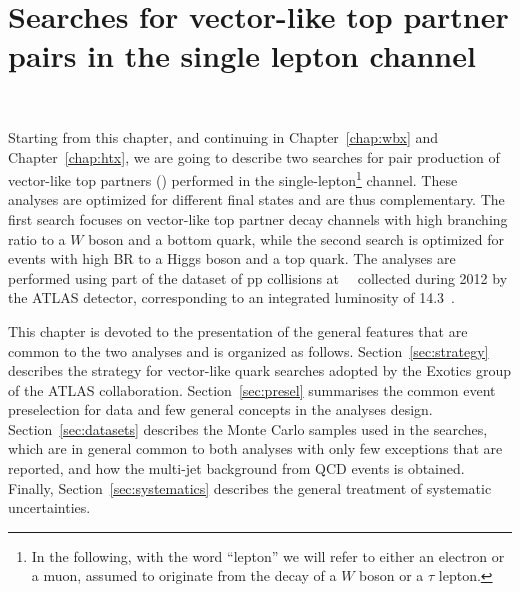 \clearpage{\pagestyle{empty}\cleardoublepage}

\chapter{Searches for vector-like top partner pairs in the single lepton channel}~\label{chap:vlq}

Starting from this chapter, and continuing in Chapter~\ref{chap:wbx} 
and Chapter~\ref{chap:htx}, we are going to describe two 
searches for pair production of vector-like top 
partners (\TTbar) performed in the 
single-lepton\footnote{In the following, with the 
word ``lepton'' we will 
refer to either an electron or a muon, assumed to 
originate from the decay of a $W$ boson or a $\tau$ lepton.}
 channel. These analyses
are optimized for different final states and are thus complementary.
The first search focuses on  vector-like top partner decay channels with high 
branching ratio to 
a $W$ boson and a bottom quark, while the second search is optimized for events with 
high BR to a Higgs boson and a top quark. 
The analyses are performed using part
of the dataset of pp collisions at
~\tev\ collected during 2012
by the ATLAS detector, corresponding to an integrated luminosity of  14.3~\ifb.

This chapter is devoted to the presentation of the general features that are common to 
the two analyses and is organized as follows.
Section~\ref{sec:strategy}
describes the strategy for vector-like quark searches adopted 
by the Exotics group of the ATLAS collaboration.
Section~\ref{sec:presel}
summarises the common event preselection for data and few general concepts in the
analyses design. Section~\ref{sec:datasets}
describes the Monte Carlo samples used in the searches, which
are in general common to both analyses with only few exceptions that are reported,
and how the multi-jet background from QCD events is
obtained. 
Finally, Section~\ref{sec:systematics} 
describes the general treatment of systematic uncertainties.

